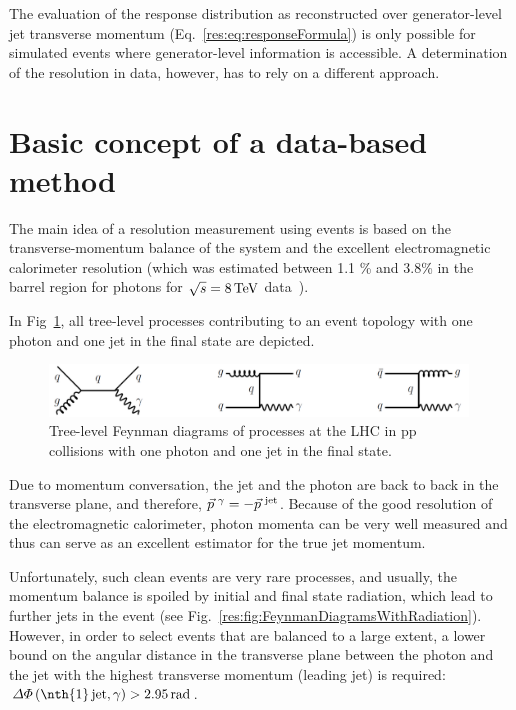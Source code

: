 The evaluation of the response distribution as reconstructed over generator-level jet transverse momentum (Eq.~\eqref{res:eq:responseFormula})
is only possible for simulated events where generator-level information is accessible. 
A determination of the resolution in data, however, has to rely on a different approach.\\


\section{Basic concept of a data-based method}
The main idea of a resolution measurement using \GAMJET events is based on the transverse-momentum balance of the \GAMJET system and the excellent electromagnetic calorimeter resolution
(which was estimated between 1.1 \% and 3.8\% in the barrel region for photons for $\sqrt{s}=8\,\text{Te}\kern-0.06667em\text{V}$ data~\cite{bib:CMS:PhotonResolution_8TeV}).

In Fig~\ref{res:fig:FeynmanDiagrams}, all tree-level processes contributing to an event topology with one photon and one jet in the final state are depicted. 
\begin{figure}[t]
  \centering
      \includegraphics[width=0.99\textwidth]{figures/resolution/generalApproach/FeynmanDiagram.pdf}
  \caption{Tree-level Feynman diagrams of processes at the LHC in pp collisions with one photon and one jet in the final state.}  
  \label{res:fig:FeynmanDiagrams}
\end{figure}
Due to momentum conversation, the jet and the photon are back to back in the transverse plane, and therefore, $\vec{p}^{\,\,\gamma} = -\vec{p}^{\,\,\text{jet}}$. 
Because of the good resolution of the electromagnetic calorimeter, photon momenta can be very well measured 
and thus can serve as an excellent estimator for the true jet momentum.


Unfortunately, such clean events are very rare processes, and usually, the momentum balance is spoiled by initial and final state radiation, which lead to further jets in the event 
(see Fig.~\ref{res:fig:FeynmanDiagramsWithRadiation}). 
However, in order to select events that are balanced to a large extent, a lower bound 
on the angular distance in the transverse plane between the photon and the jet with the highest transverse momentum (leading jet) is required: $\Delta\Phi \left(\text{\nth{1}\,jet,\,} \gamma \right)>2.95\,\unit{rad}$. 


